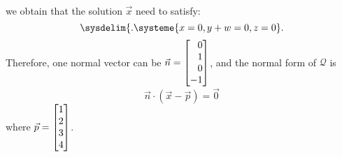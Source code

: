 \begin{example}
\begin{align*}
    \end{align*}
    we obtain that the solution $\vec x$ need to satisfy:
    \begin{equation}
	\sysdelim\{.
		\systeme{
		    x=0,
			y+w=0,
			z=0
		}.
    \end{equation}
    Therefore, one normal vector can be $\vec n =\mat{0\\1\\0\\-1}$, and the normal form of $\mathcal Q$ is 
    \[
        \vec n\cdot(\vec x-\vec p)=\vec 0
    \]
    where $\vec p=\mat{1\\2\\3\\4}$.
\end{example}



